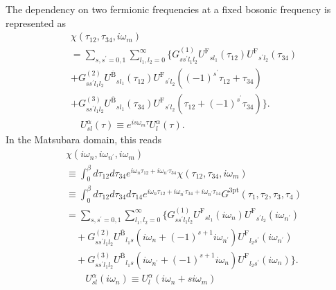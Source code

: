 \documentclass[prb,twocolumn,superscriptaddress]{revtex4-1}
\newcommand{\np}{\ensuremath{{n^\prime }}}
\newcommand{\Gthree}{\ensuremath{G^\mathrm{3pt}}}
\newcommand{\UF}{\ensuremath{U^\mathrm{F}}}
\newcommand{\enhUB}{\ensuremath{U^\mathrm{\overline{B}}}}
\begin{document}
The dependency on two fermionic frequencies at a fixed bosonic frequency is represented as
\begin{align}
	& 	\chi(\tau_{12}, \tau_{34}, i\omega_m) \nonumber\\
	& =  \sum_{s,s^\prime=0,1}\sum_{l_1,l_2=0}^\infty \Big\{G^{(1)}_{s s^\prime l_1l_2}
	\UF_{s l_1}(\tau_{12})\UF_{s^\prime l_2}(\tau_{34}) \nonumber\\
	& +  G_{s s^\prime l_1 l_2}^{(2)} 
    \enhUB_{s l_1}(\tau_{12}) \UF_{s^\prime l_2}((-1)^{s^\prime} \tau_{12}+\tau_{34}) \nonumber\\
	& + 
	G_{s s^\prime l_1 l_2}^{(3)}
	\enhUB_{s l_1}(\tau_{34})\UF_{s^\prime l_2}( \tau_{12}+(-1)^{s^\prime}\tau_{34})
	\Big\}.\\
	& \hspace{1em}U^\alpha_{s l}(\tau) \equiv e^{is \omega_m \tau} U^\alpha_l(\tau).
\end{align}
In the Matsubara domain, this reads
\begin{align}
	&\chi(i\omega_n, i\omega_\np, i\omega_m)\nonumber\\
	&\equiv \int_0^\beta d\tau_{12} d\tau_{34} e^{i\omega_n \tau_{12} + i\omega_\np \tau_{34}} \chi(\tau_{12}, \tau_{34}, i\omega_m)
	\nonumber\\
	&\equiv \int_0^\beta d\tau_{12} d\tau_{34} d\tau_{14} e^{i\omega_n \tau_{12} + i\omega_\np \tau_{34} + i\omega_\np \tau_{14}} \Gthree(\tau_1, \tau_2, \tau_3, \tau_4)
	\nonumber\\
	& =  \sum_{s,s^\prime=0,1}\sum_{l_1,l_2=0}^\infty \Big\{G^{(1)}_{s s^\prime l_1l_2}
	\UF_{s l_1}(i\omega_n)\UF_{s^\prime l_2}(i\omega_\np) \nonumber\\
	& \quad+  G_{s s^\prime l_1 l_2}^{(2)} \enhUB_{l_1 s}(i\omega_n + (-1)^{s+1} i \omega_\np)\UF_{l_2 s^\prime}(i \omega_\np)
	\nonumber\\
	& \quad+
	G_{s s^\prime l_1 l_2}^{(3)} \enhUB_{l_1 s}(i\omega_\np + (-1)^{s+1} i\omega_n) \UF_{l_2 s^\prime}(i\omega_n)
	\Big\}.\label{eq:three-point-exp2}\\
	& \hspace{2em}U_{s l}^\alpha(i\omega_n) \equiv U_{ l}^\alpha(i\omega_n + s i\omega_m)
\end{align}
\end{document}

